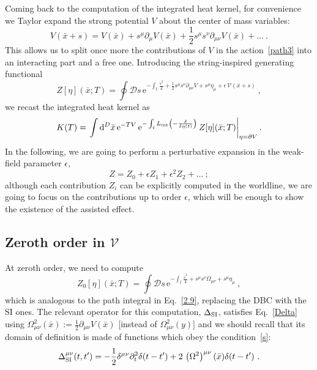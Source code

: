\documentclass[12pt,a4paper]{article}
\numberwithin{equation}{section}
\numberwithin{equation}{section}
\begin{document}
Coming back to the computation of the integrated heat kernel, for convenience we Taylor expand the strong potential $V$ about the center of mass variables:
\begin{equation}
 V(\bar{x}+s)= V(\bar{x})+s^\mu \partial_\mu V(\bar{x})+\frac12 s^\mu s^\nu \partial_{\mu\nu} V(\bar{x}) + \dots\ .
\end{equation}
This allows us to split once more the contributions of $V$ in the action~\eqref{path3} into an interacting part and a free one. Introducing the string-inspired generating functional
\begin{equation}
Z[\eta](\bar{x};T)=\oint \mathcal{D}s \, \mathrm{e}^{-\int_t \frac{\dot{s}^2}{4}+\frac12 s^\mu s^\nu \partial_{\mu\nu}V+s^\mu\eta_\mu+\epsilon \, \mathcal{V}(\bar{x}+s)}\ ,
\end{equation}
we recast the integrated heat kernel as
\begin{equation} \label{path4}
{K}(T)=\left. \int {\rm d}^D\bar{x} \, \mathrm{e}^{-TV}\, \mathrm{e}^{-\int_t L_{\mathrm{int}}\left( -\frac{\delta}{\delta \eta(t)} \right)} \, Z[\eta](\bar{x};T)\right|_{\eta=\partial V} .
\end{equation}
In the following, we are going to perform a perturbative expansion in the weak-field parameter $\epsilon$, 
\begin{equation}
Z=Z_0+\epsilon Z_1+\epsilon^2 Z_2 + \dots\ ;
\end{equation}
although each contribution $Z_i$ can be explicitly computed in the worldline, we are going to focus on the contributions up to order $\epsilon$, which will be enough to show the existence of the assisted effect.


\subsection{Zeroth order in $\mathcal{V}$}
At zeroth order, we need to compute
\begin{equation}
Z_0[\eta](\bar{x};T)=\oint \mathcal{D}s \, \mathrm{e}^{-\int_t \frac{\dot{s}^2}{4}+ s^\mu s^\nu \Omega_{\mu\nu}+s^\mu\eta_\mu}\ ,
\end{equation}
which is analogous to the path integral in Eq.~\eqref{2.9}, replacing the DBC with the SI ones. 
The relevant operator for this computation, $\Delta_{\rm SI}$, satisfies Eq.~\eqref{Delta} using $\Omega^2_{\mu\nu}(\bar{x}):=\tfrac12\partial_{\mu\nu} V(\bar{x})$ [instead of $\Omega^2_{\mu\nu}({y})$] and we should recall that its domain of definition is made of functions which obey the condition~\eqref{s}:
\begin{equation} \label{eq:Delta_SI}
{\Delta^{\mu\nu}_{\rm SI} (t,t')=-\frac12 \delta^{\mu\nu}\partial^2_t\delta(t-t')+2 \, \left(\Omega^2\right)^{\mu\nu}(\bar{x})\delta(t-t')}\ .
\end{equation}
\end{document}
